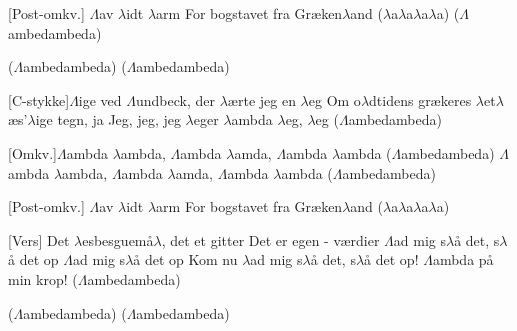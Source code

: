 \documentclass[a4paper,11pt]{article}
\begin{document}
\begin{song}
[Post-omkv.] $\Lambda$av $\lambda$idt $\lambda$arm 
For bogstavet fra Græken$\lambda$and ($\lambda$a$\lambda$a$\lambda$a$\lambda$a)
($\Lambda$ambedambeda)

($\Lambda$ambedambeda)
($\Lambda$ambedambeda)

[C-stykke]$\Lambda$ige ved $\Lambda$undbeck, der $\lambda$ærte jeg en $\lambda$eg
Om o$\lambda$dtidens grækeres $\lambda$et$\lambda$æs'$\lambda$ige tegn, ja
Jeg, jeg, jeg $\lambda$eger $\lambda$ambda $\lambda$eg, $\lambda$eg
($\Lambda$ambedambeda)

[Omkv.]$\Lambda$ambda $\lambda$ambda, $\Lambda$ambda $\lambda$amda, $\Lambda$ambda $\lambda$ambda
($\Lambda$ambedambeda)
$\Lambda$ambda $\lambda$ambda, $\Lambda$ambda $\lambda$amda, $\Lambda$ambda $\lambda$ambda
($\Lambda$ambedambeda)

[Post-omkv.] $\Lambda$av $\lambda$idt $\lambda$arm
For bogstavet fra Græken$\lambda$and
($\lambda$a$\lambda$a$\lambda$a$\lambda$a)

[Vers] Det $\lambda$esbesguemå$\lambda$, det et gitter
Det er egen - værdier
$\Lambda$ad mig s$\lambda$å det, s$\lambda$å det op 
$\Lambda$ad mig s$\lambda$å det op
Kom nu $\lambda$ad mig s$\lambda$å det, s$\lambda$å det op!
$\Lambda$ambda på min krop! 
($\Lambda$ambedambeda)

($\Lambda$ambedambeda)
($\Lambda$ambedambeda)
\end{song}
\end{document}
